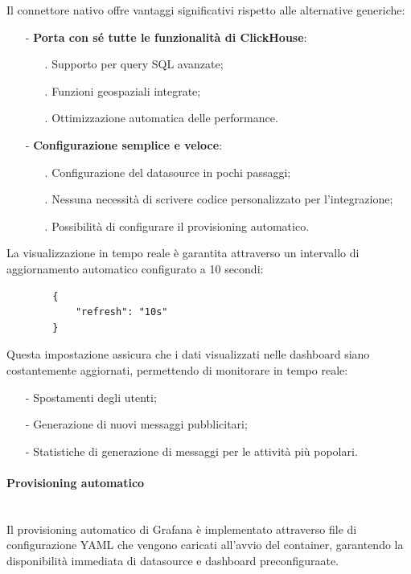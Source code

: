\documentclass[10pt]{article}
\newcommand{\myparagraph}[1]{\paragraph{#1}\mbox{}\\}
\begin{document}
        Il connettore nativo offre vantaggi significativi rispetto alle alternative generiche:
        
        \begin{itemize}
            \item[-] \textbf{Porta con sé tutte le funzionalità di ClickHouse}:
            \begin{itemize}
            \item[.] Supporto per query SQL avanzate;
            \item[.] Funzioni geospaziali integrate;
            \item[.] Ottimizzazione automatica delle performance.
            \end{itemize}
            \item[-] \textbf{Configurazione semplice e veloce}:
            \begin{itemize}
            \item[.] Configurazione del datasource in pochi passaggi;
            \item[.] Nessuna necessità di scrivere codice personalizzato per l'integrazione;
            \item[.] Possibilità di configurare il provisioning automatico.
            \end{itemize}
        \end{itemize}
        
        La visualizzazione in tempo reale è garantita attraverso un intervallo di aggiornamento automatico configurato a 10 secondi:
        \begin{lstlisting}
        {
            "refresh": "10s"
        }
        \end{lstlisting}

        Questa impostazione assicura che i dati visualizzati nelle dashboard siano costantemente aggiornati, permettendo di monitorare in tempo reale:
        \begin{itemize}
            \item[-] Spostamenti degli utenti;
            \item[-] Generazione di nuovi messaggi pubblicitari;
            \item[-] Statistiche di generazione di messaggi per le attività più popolari.
        \end{itemize}

        \myparagraph{Provisioning automatico}
        Il provisioning automatico di Grafana è implementato attraverso file di configurazione YAML che vengono caricati all'avvio del container, garantendo la disponibilità immediata di datasource e dashboard preconfiguraate.
\end{document}
